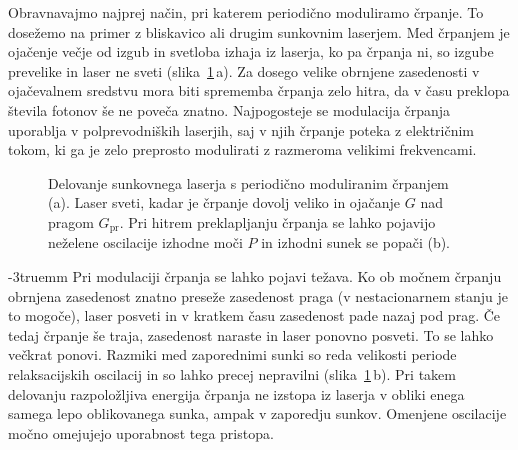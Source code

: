 Obravnavajmo najprej način, pri katerem periodično moduliramo črpanje.
To dosežemo na primer z bliskavico ali drugim sunkovnim laserjem. Med 
črpanjem je ojačenje večje od izgub in svetloba izhaja iz laserja, ko pa črpanja 
ni, so izgube prevelike in laser ne sveti (slika~\ref{fig:Gswitch}\,a). Za dosego velike
obrnjene zasedenosti v ojačevalnem sredstvu mora biti sprememba črpanja zelo hitra, 
da v času preklopa števila fotonov še ne poveča znatno. 
Najpogosteje se modulacija črpanja uporablja
v polprevodniških laserjih, saj v njih črpanje poteka z električnim tokom, ki 
ga je zelo preprosto modulirati z razmeroma velikimi frekvencami. 
\begin{figure}[ht]
\centering
\def\svgwidth{120truemm} 

\caption{Delovanje sunkovnega laserja s periodično moduliranim črpanjem (a). Laser sveti,
kadar je črpanje dovolj veliko in ojačanje $G$ nad pragom $G_{\mathrm{pr}}$. 
Pri hitrem preklapljanju črpanja se lahko pojavijo neželene oscilacije izhodne moči $P$ in 
izhodni sunek se popači (b).}
\label{fig:Gswitch}
\end{figure}
\vglue-3truemm
Pri modulaciji črpanja se lahko pojavi težava. Ko ob močnem črpanju 
obrnjena zasedenost znatno preseže zasedenost praga (v nestacionarnem stanju 
je to mogoče), laser posveti in v kratkem času zasedenost pade nazaj pod prag. 
Če tedaj črpanje še traja, zasedenost naraste in laser ponovno posveti. 
To se lahko večkrat ponovi. Razmiki med zaporednimi sunki
so reda velikosti periode relaksacijskih oscilacij in so lahko precej
nepravilni  (slika~\ref{fig:Gswitch}\,b). Pri takem delovanju
razpoložljiva energija črpanja ne izstopa iz laserja v obliki enega samega lepo oblikovanega sunka, 
ampak v zaporedju sunkov. Omenjene oscilacije močno omejujejo uporabnost tega pristopa.


